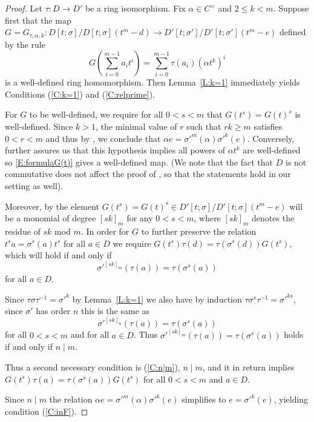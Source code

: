\documentclass{amsart}
\theoremstyle{plain}
\theoremstyle{definition}
\numberwithin{equation}{section}
\numberwithin{figure}{section}
\begin{document}
\begin{proof}
Let $\tau:D\to D'$ be a ring isomorphism. Fix $\alpha\in C^\times$ and  $2\leq k<m$.  Suppose first that the map $G=G_{\tau,\alpha,k}:D[t;\sigma]/D[t;\sigma](t^m-d)\to D'[t;\sigma']/D'[t;\sigma'](t^m-e)$ defined by the rule
\begin{equation}\label{E:formulaG(t)}
G( \sum_{i=0}^{m-1}a_it^i ) = \sum_{i=0}^{m-1}\tau(a_i) (\alpha t^k)^i
\end{equation}
is a well-defined ring homomorphism.
Then Lemma~\ref{L:k=1} immediately yields Conditions (\ref{C:k=1}) and (\ref{C:relprime}).

For $G$ to be well-defined, we require for all $0<s <m$ that $G(t^s)=G(t)^s$ is well-defined.  Since $k>1$, the minimal value of $r$ such that $rk\geq m$ satisfies $0<r<m$ and thus by \cite[Theorem 3.3]{NevPum2025}, we conclude that $\alpha e = {\sigma'}^{m}(\alpha){\sigma'}^k(e)$.  Conversely, \cite[Theorem 3.3]{NevPum2025} further assures us that this hypothesis implies all powers of $\alpha t^k$ are well-defined so \eqref{E:formulaG(t)} gives a well-defined map. (We note that the fact that $D$ is not commutative does not affect the proof of \cite[Theorem 3.3]{NevPum2025}, so that the statements hold in our setting as well).

Moreover, by \cite[Theorem 3.3]{NevPum2025}  the element $G(t^s)=G(t)^s \in D'[t;\sigma]/D'[t;\sigma](t^m-e)$ will be a monomial of degree $[sk]_{m}$ for any $0<s<m$, where  $[sk]_{m}$ denotes the residue of $sk$ mod $m$. In order for $G$ to further preserve the relation $t^sa={\sigma}^s(a)t^s$ for all $a\in D$ we require $G(t^s)\tau(d) = \tau({\sigma}^s(d))G(t^s)$, which will hold if and only if
$$
{\sigma'}^{[sk]_{m}}(\tau(a))=\tau(\sigma^{s}(a))
$$
for all $a\in D$.

Since $ \tau\sigma \tau^{-1}={\sigma'}^k$ by Lemma~\ref{L:k=1} we also have  by induction
$ \tau\sigma^s \tau^{-1}={\sigma'}^{ks}$, since $\sigma'$ has order $n$ this is the same as
$$
{\sigma'}^{[sk]_{n}}(\tau(a))=\tau(\sigma^{s}(a))
$$
for all $0<s<m$ and for all $a\in D$. Thus ${\sigma'}^{[sk]_{m}}(\tau(a))=\tau(\sigma^{s}(a))$  holds if and only if $n\mid m$.

 Thus a second necessary condition is (\ref{C:n|m}),  $n\mid m$, and it in return implies $G(t^s)\tau(a) = \tau(\sigma^s(a))G(t^s)$ for all $0<s<m$ and $a\in D$.


Since $n\mid m$ the relation $\alpha e = {\sigma'}^{m}(\alpha){\sigma'}^k(e)$
 simplifies to $e ={\sigma'}^k(e)$, 
 yielding condition (\ref{C:inF}).


\end{proof}
\end{document}
